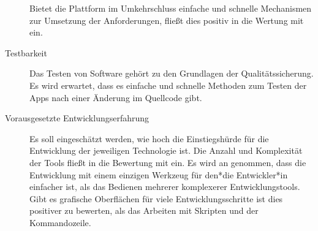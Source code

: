 \begin{description}
		Bietet die Plattform im Umkehrschluss einfache und schnelle Mechanismen zur Umsetzung der Anforderungen, fließt dies positiv in die Wertung mit ein.
		
	\item[Testbarkeit]
		Das Testen von Software gehört zu den Grundlagen der Qualitätssicherung. Es wird erwartet, dass es einfache und schnelle Methoden zum Testen der Apps nach einer Änderung im Quellcode gibt.
	
	\item[Vorausgesetzte Entwicklungserfahrung]
		Es soll eingeschätzt werden, wie hoch die Einstiegshürde für die Entwicklung der jeweiligen Technologie ist. Die Anzahl und Komplexität der Tools fließt in die Bewertung mit ein. Es wird an genommen, dass die Entwicklung mit einem einzigen Werkzeug für den*die Entwickler*in einfacher ist, als das Bedienen mehrerer komplexerer Entwicklungstools. Gibt es grafische Oberflächen für viele Entwicklungsschritte ist dies positiver zu bewerten, als das Arbeiten mit Skripten und der Kommandozeile.
		
\end{description}

